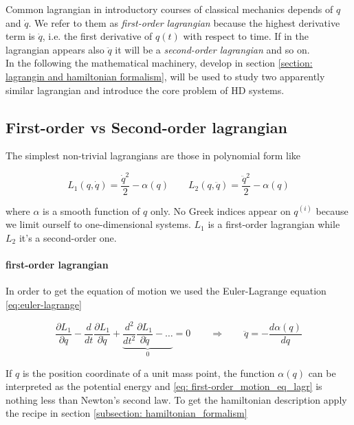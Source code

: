 Common lagrangian in introductory courses of classical mechanics depends of $q$
and $\dot{q}$. We refer to them as \emph{first-order lagrangian} because the
highest derivative term is $\dot{q}$, i.e. the first derivative of $q(t)$ with
respect to time. If in the lagrangian appears also $\ddot{q}$ it will be a
\emph{second-order lagrangian} and so on. \\

In the following the mathematical machinery, develop in section \ref{section:
lagrangin and hamiltonian formalism}, will be used to study two apparently
similar lagrangian and introduce the core problem of HD systems.

\subsection{First-order vs Second-order lagrangian}
The simplest non-trivial lagrangians are those in polynomial form like

\begin{equation*}
  L_1(q, \dot{q}) = \frac{\dot{q}^2}{2} - \alpha(q) \qquad
  L_2(q, \ddot{q}) = \frac{\ddot{q}^2}{2} - \alpha(q)
\end{equation*}

where $\alpha$ is a smooth function of $q$ only. No Greek indices appear on
$q^{(i)}$ because we limit ourself to one-dimensional systems. $L_1$ is a
first-order lagrangian while $L_2$ it's a second-order one.


\paragraph{first-order lagrangian} In order to get the equation of motion we
used the Euler-Lagrange equation \eqref{eq:euler-lagrange}

\begin{equation} \label{eq: first-order_motion_eq_lagr}
  \frac{\partial L_1}{\partial q} -
  \frac{d}{dt}\frac{\partial L_1}{\partial \dot{q}} +
  \underbrace{
  \frac{d^2}{dt^2}\frac{\partial L_1}{\partial \ddot{q}} - \ldots }_0 = 0
  \qquad \Rightarrow \qquad
  \ddot{q} = - \frac{d\alpha(q)}{dq}
\end{equation}

If $q$ is the position coordinate of a unit mass point, the function $\alpha(q)$
can be interpreted as the potential energy and \eqref{eq:
first-order_motion_eq_lagr} is nothing less than Newton's second law. To get the
hamiltonian description apply the recipe in section \ref{subsection:
hamiltonian_formalism}

